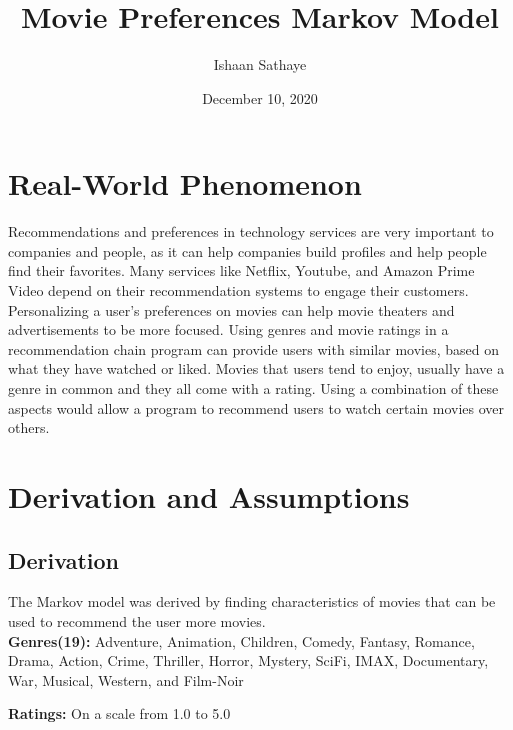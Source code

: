 \documentclass{article}
\title{Movie Preferences Markov Model}
\author{Ishaan Sathaye }
\date{December 10, 2020}
\begin{document}
\maketitle

\section{Real-World Phenomenon}
Recommendations and preferences in technology services are very important to 
companies and people, as it can help companies build profiles and help people find their favorites.
Many services like Netflix, Youtube, and Amazon Prime Video depend on their recommendation systems to engage their customers.
Personalizing a user's preferences on movies can help movie theaters and advertisements to be more focused. Using genres and movie ratings
in a recommendation chain program can provide users with similar movies, based on what they have watched or liked. Movies that users 
tend to enjoy, usually have a genre in common and they all come with a rating. Using a combination of these aspects would allow a program to 
recommend users to watch certain movies over others. 

\section{Derivation and Assumptions}
\subsection{Derivation}
The Markov model was derived by finding characteristics of movies that can be used to recommend the user more movies.\\

\textbf{Genres(19):} Adventure, Animation, Children, Comedy, Fantasy, Romance, Drama, Action, Crime, Thriller, Horror, Mystery, SciFi, IMAX, Documentary,
War, Musical, Western, and Film-Noir

\textbf{Ratings:} On a scale from 1.0 to 5.0\\
\end{document}

